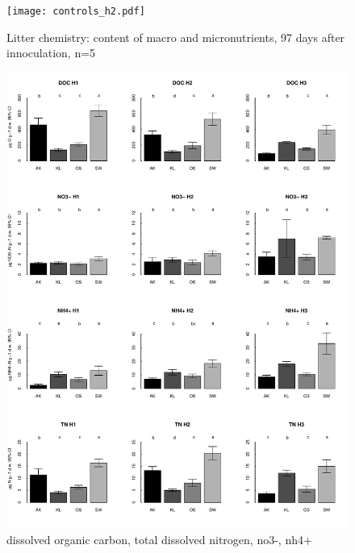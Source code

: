 \documentclass[journal abbreviation]{copernicus}
\begin{document}
\begin{figure}[t]
\vspace*{2mm}
\begin{center}
\texttt{[image: controls\_h2.pdf]}
\end{center}
\label{litchem_h2}
\caption{Litter chemistry: content of macro and micronutrients, 97 days after innoculation, n=5}
\end{figure}

\begin{figure}[t]
\vspace*{2mm}
\begin{center}
\includegraphics[width=12cm]{doc_barplots.pdf}
\end{center}
\label{doc}
\caption{dissolved organic carbon, total dissolved nitrogen, no3-, nh4+}
\end{figure}
\end{document}
